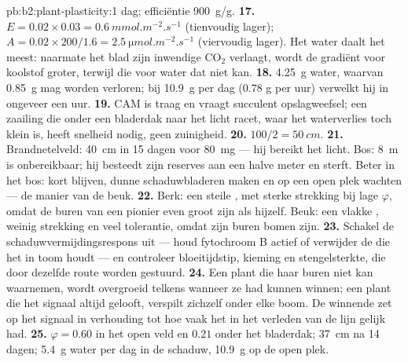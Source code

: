 \begin{solution}{pb:b2:plant-plasticity:1}
dag; efficiëntie \qty{900}{g/g}.
\textbf{17.} $E = 0.02\times 0.03 = \qty{0.6}{mmol.m^{-2}.s^{-1}}$
(tienvoudig lager); $A = 0.02\times 200/1.6 = \qty{2.5}{\micro
mol.m^{-2}.s^{-1}}$ (viervoudig lager). Het water daalt het meest: naarmate
het blad zijn inwendige $\mathrm{CO_2}$ verlaagt, wordt de gradiënt voor
koolstof groter, terwijl die voor water dat niet kan.
\textbf{18.} \qty{4.25}{g} water, waarvan \qty{0.85}{g} mag worden
verloren; bij \qty{10.9}{g} per dag ($0.78$ g per uur) verwelkt hij in
ongeveer een uur.
\textbf{19.} CAM is traag en vraagt succulent opslagweefsel; een zaailing die
onder een bladerdak naar het licht racet, waar het waterverlies toch klein
is, heeft snelheid nodig, geen zuinigheid.
\textbf{20.} $100/2 = \qty{50}{cm}$.
\textbf{21.} Brandnetelveld: \qty{40}{cm} in 15 dagen voor \qty{80}{mg} ---
hij bereikt het licht. Bos: \qty{8}{m} is onbereikbaar; hij besteedt zijn
reserves aan een halve meter en sterft. Beter in het bos: kort blijven, dunne
schaduwbladeren maken en op een open plek wachten --- de manier van de beuk.
\textbf{22.} Berk: een steile , met sterke strekking bij lage
$\varphi$, omdat de buren van een pionier even groot zijn als hijzelf. Beuk:
een vlakke , weinig strekking en veel tolerantie, omdat zijn buren
bomen zijn.
\textbf{23.} Schakel de schaduwvermijdingsrespons uit --- houd fytochroom B
actief of verwijder de  die het in toom houdt --- en
controleer bloeitijdstip, kieming en stengelsterkte, die door dezelfde route
worden gestuurd.
\textbf{24.} Een plant die haar buren niet kan waarnemen, wordt overgroeid
telkens wanneer ze had kunnen winnen; een plant die het signaal altijd
gelooft, verspilt zichzelf onder elke boom. De winnende  zet op
het signaal in verhouding tot hoe vaak het in het verleden van de lijn gelijk
had.
\textbf{25.} $\varphi = 0.60$ in het open veld en $0.21$ onder het bladerdak;
\qty{37}{cm} na 14 dagen; \qty{5.4}{g} water per dag in de schaduw,
\qty{10.9}{g} op de open plek.
\end{solution}
